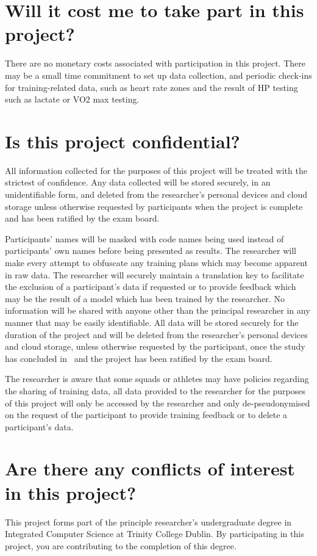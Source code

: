 \section*{Will it cost me to take part in this project?}
There are no monetary costs associated with participation in this project. There may be a small time commitment to set up data collection, and periodic check-ins for training-related data, such as heart rate zones and the result of HP testing such as lactate or VO2 max testing.
\section*{Is this project confidential?}
All information collected for the purposes of this project will be treated with the strictest of confidence. Any data collected will be stored securely, in an unidentifiable form, and deleted from the researcher's personal devices and cloud storage unless otherwise requested by participants when the project is complete and has been ratified by the exam board.

Participants' names will be masked with code names being used instead of participants' own names before being presented as results. The researcher will make every attempt to obfuscate any training plans which may become apparent in raw data. The researcher will securely maintain a translation key to facilitate the exclusion of a participant's data if requested or to provide feedback which may be the result of a model which has been trained by the researcher. No information will be shared with anyone other than the principal researcher in any manner that may be easily identifiable. All data will be stored securely for the duration of the project and will be deleted from the researcher's personal devices and cloud storage, unless otherwise requested by the participant, once the study has concluded in \deadline~and the project has been ratified by the exam board.

The researcher is aware that some squads or athletes may have policies regarding the sharing of training data, all data provided to the researcher for the purposes of this project will only be accessed by the researcher and only de-pseudonymised on the request of the participant to provide training feedback or to delete a participant's data.
\section*{Are there any conflicts of interest in this project?}
This project forms part of the principle researcher's undergraduate degree in Integrated Computer Science at Trinity College Dublin. By participating in this project, you are contributing to the completion of this degree.
